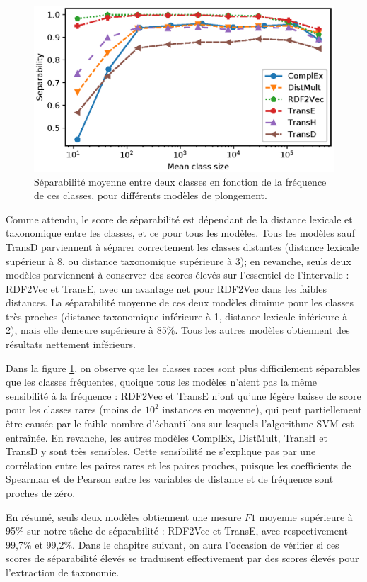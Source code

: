 \begin{figure}[h]
  \centering
  \includegraphics[width=0.8\linewidth]{fig/plot/separability2_type1.eps}
  \caption[Séparabilité moyenne en fonction de la fréquence des classes]{Séparabilité moyenne entre deux classes en fonction de la fréquence de ces classes, pour différents modèles de plongement.}
  \label{fig:separability-freq}
\end{figure}

Comme attendu, le score de séparabilité est dépendant de la distance lexicale et taxonomique entre les classes, et ce pour tous les modèles. Tous les modèles sauf TransD parviennent à séparer correctement les classes distantes (distance lexicale supérieur à 8, ou distance taxonomique supérieure à 3); en revanche, seuls deux modèles parviennent à conserver des scores élevés sur l'essentiel de l'intervalle : RDF2Vec et TransE, avec un avantage net pour RDF2Vec dans les faibles distances. La séparabilité moyenne de ces deux modèles diminue pour les classes très proches (distance taxonomique inférieure à 1, distance lexicale inférieure à 2), mais elle demeure supérieure à 85\%. Tous les autres modèles obtiennent des résultats nettement inférieurs.

Dans la figure \ref{fig:separability-freq}, on observe que les classes rares sont plus difficilement séparables que les classes fréquentes, quoique tous les modèles n'aient pas la même sensibilité à la fréquence : RDF2Vec et TransE n'ont qu'une légère baisse de score pour les classes rares (moins de $10^2$ instances en moyenne), qui peut partiellement être causée par le faible nombre d'échantillons sur lesquels l'algorithme SVM est entraînée. En revanche, les autres modèles ComplEx, DistMult, TransH et TransD y sont très sensibles. Cette sensibilité ne s'explique pas par une corrélation entre les paires rares et les paires proches, puisque les coefficients de Spearman et de Pearson entre les variables de distance et de fréquence sont proches de zéro.


En résumé, seuls deux modèles obtiennent une mesure $F1$ moyenne supérieure à 95\% sur notre tâche de séparabilité : RDF2Vec et TransE, avec respectivement 99,7\% et 99,2\%. Dans le chapitre suivant, on aura l'occasion de vérifier si ces scores de séparabilité élevés se traduisent effectivement par des scores élevés pour l'extraction de taxonomie.
